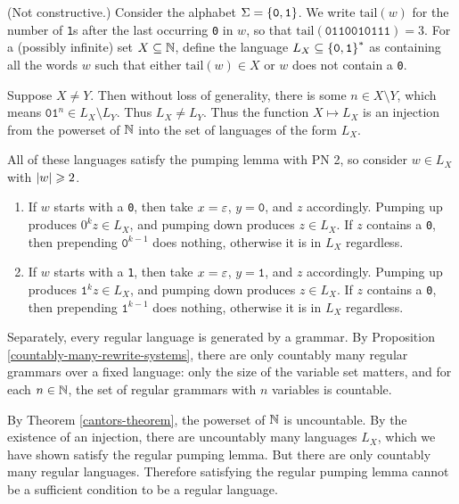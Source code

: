 \documentclass{article}
\begin{document}
\begin{prf}
	(Not constructive.) Consider the alphabet $\Sigma = \left\lbrace \texttt{0}, \texttt{1} \right\rbrace$. We write $\mathrm{tail}(w)$ for the number of \texttt{1}s after the last occurring \texttt{0} in $w$, so that $\mathrm{tail}(\texttt{0110010111}) = 3$. For a (possibly infinite) set $X \subseteq \mathbb{N}$, define the language $L_X \subseteq \left\lbrace \texttt{0}, \texttt{1} \right\rbrace^*$ as containing all the words $w$ such that either $\mathrm{tail}(w) \in X$ or $w$ does not contain a \texttt{0}.
	    
	Suppose $X \neq Y$. Then without loss of generality, there is some $n \in X \setminus Y$, which means $\texttt{01}^n \in L_X \setminus L_Y$. Thus $L_X \neq L_Y$. Thus the function $X \mapsto L_X$ is an injection from the powerset of $\mathbb{N}$ into the set of languages of the form $L_X$.
	    
	All of these languages satisfy the pumping lemma with PN 2, so consider $w \in L_X$ with $\left\lvert w \right\rvert \geqslant 2$.
	\begin{enumerate}
		\item If $w$ starts with a \texttt{0}, then take $x = \varepsilon$, $y = \texttt{0}$, and $z$ accordingly. Pumping up produces $0^kz \in L_X$, and pumping down produces $z \in L_X$. If $z$ contains a \texttt{0}, then prepending $\texttt{0}^{k-1}$ does nothing, otherwise it is in $L_X$ regardless.
		\item If $w$ starts with a \texttt{1}, then take $x = \varepsilon$, $y = \texttt{1}$, and $z$ accordingly. Pumping up produces $\texttt{1}^kz \in L_X$, and pumping down produces $z \in L_X$. If $z$ contains a \texttt{0}, then prepending $\texttt{1}^{k-1}$ does nothing, otherwise it is in $L_X$ regardless.
	\end{enumerate}
		
	Separately, every regular language is generated by a grammar. By Proposition \ref{countably-many-rewrite-systems}, there are only countably many regular grammars over a fixed language: only the size of the variable set matters, and for each $n \in \mathbb{N}$, the set of regular grammars with $n$ variables is countable.
	    
	By Theorem \ref{cantors-theorem}, the powerset of $\mathbb{N}$ is uncountable. By the existence of an injection, there are uncountably many languages $L_X$, which we have shown satisfy the regular pumping lemma. But there are only countably many regular languages. Therefore satisfying the regular pumping lemma cannot be a sufficient condition to be a regular language.   
\end{prf}

\end{document}
